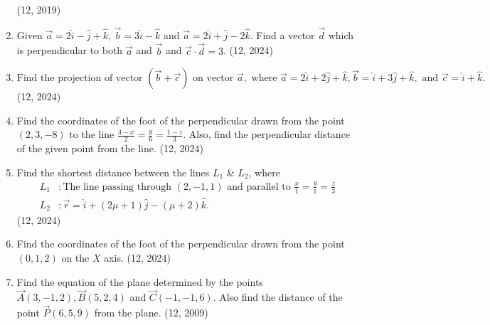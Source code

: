 \begin{enumerate}[label=\thesubsection.\arabic*, ref=\thesubsection.\theenumi]
		\hfill (12, 2019)
\item Given $\vec{a}=2\hat{i}-\hat{j}+\hat{k}$, $\vec{b}=3\hat{i}-\hat{k}$ and $\vec{a}=2\hat{i}+\hat{j}-2\hat{k}$. Find a vector $\vec{d}$ which is perpendicular to both $\vec{a}$ and $\vec{b}$ and $\vec{c}\cdot\vec{d}=3$.
		\hfill (12, 2024)
\item $\text{Find the projection of vector }(\vec{b} + \vec{c}) \text{ on vector } \vec{a}, \text{ where } \vec{a} = 2\hat{i} + 2\hat{j} + \hat{k}, \vec{b} = \hat{i} + 3\hat{j} + \hat{k}, \text{ and } \vec{c} = \hat{i} + \hat{k}.$
		\hfill (12, 2024)
\item  Find the coordinates of the foot of the perpendicular drawn from the point $(2, 3, -8)$ to the line $\frac{4-x}{2} = \frac{y}{6} = \frac{1-z}{3}$.
Also, find the perpendicular distance of the given point from the line.
		\hfill (12, 2024)
\item Find the shortest distance between the lines  $L_1$  \& $ L_2$, where 
\begin{align*}
	L_1&: \text{The line passing through }(2,-1, 1) \text{ and parallel to } \frac{x}{1} = \frac{y}{1} = \frac{z}{3}\\
	L_2&: \vec{r} = \hat{i} + (2\mu+1)\hat{j} - (\mu+2)\hat{k}.
\end{align*}
		\hfill (12, 2024)
	\item Find the coordinates of the foot of the perpendicular drawn from the point $(0,1,2)$ on the $X$ axis. 
		\hfill (12, 2024)
\item 
Find the equation of the plane determined by the points $\vec{A}(3, -1, 2), \vec{B}(5, 2, 4)$ and $\vec{C}(-1, -1, 6)$. Also find the distance of the point $\vec{P}(6, 5, 9)$ from the plane.
\hfill	(12, 2009)
\end{enumerate}
